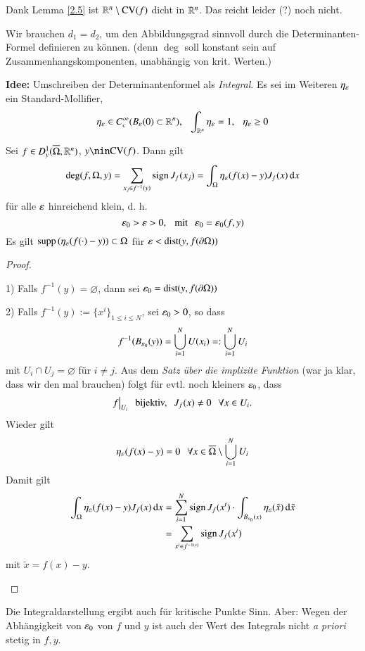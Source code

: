 \noindent Dank Lemma \ref{2.5} ist $\mathbb{R}^n\setminus \mathrm{CV}(f)$ dicht in $\mathbb{R}^n$. Das reicht leider (?)
noch nicht.

\noindent Wir brauchen $d_1=d_2$, um den Abbildungsgrad sinnvoll durch die Determinanten-Formel
definieren zu können. (denn $\deg$ soll konstant sein auf Zusammenhangskomponenten, unabhängig
von krit. Werten.)

\textbf{Idee:} Umschreiben der Determinantenformel als \textit{Integral}.
Es sei im Weiteren $\eta_\varepsilon$ ein Standard-Mollifier, 
\[
    \eta_\varepsilon \in C^\infty_c(B_\varepsilon(0)\subset \mathbb{R}^n), \hspace{.25cm} \int_{\mathbb{R}^n} \eta_\varepsilon=1,\hspace{.25cm} \eta_\varepsilon\geq 0
\]

\begin{lem}\label{2.6}
    Sei $f\in D^1_y(\overline \Omega, \mathbb{R}^n)$, $y\nin \CV(f)$. Dann gilt
    \begin{align}\label{5}
        \deg(f,\Omega,y)=\sum_{x_j\in f^{-1}(y)}\mathrm{sign}\, J_f(x_j)=\int_\Omega \eta_\varepsilon (f(x)-y) J_f(x)\, \mathrm{d} x
    \end{align}
    für alle $\varepsilon$ hinreichend klein, d. h.
    \[
        \varepsilon_0>\varepsilon>0, \hspace{.25cm} \text{mit} \hspace{.25cm} \varepsilon_0=\varepsilon_0(f,y)
    \]
    Es gilt $\mathrm{supp}\, (\eta_\varepsilon(f(\cdot)-y))\subset \Omega$ für $\varepsilon < \mathrm{dist}(y,f(\partial \Omega))$
\end{lem}

\begin{proof}
    \begin{description}
        \item{1)} 
        Falls $f^{-1}(y)=\varnothing$, dann sei $\varepsilon_0=\mathrm{dist}(y,f(\partial \Omega))$
        \item{2)}
        Falls $f^{-1}(y):= \{x^i\}_{1\leq i \leq N}$, sei $\varepsilon_0>0$, so dass
        \[
            f^{-1}(B_{\varepsilon_0}(y)) = \bigcup_{i=1}^N U(x_i)=:\bigcup_{i=1}^N U_i
        \]
        mit $U_i\cap U_j=\varnothing$ für $i\neq j$.
        Aus dem \textit{Satz über die implizite Funktion} (war ja klar, dass wir den mal brauchen)
        folgt für evtl. noch kleiners $\varepsilon_0$, dass
        \[
            f\big|_{U_i} \hspace{.25cm} \text{bijektiv,} \hspace{.25cm} J_f(x)\neq 0 \hspace{.25cm} \forall x \in U_i.
        \]
        Wieder gilt
        \[
            \eta _{\varepsilon}(f(x)-y)=0 \hspace{.25cm} \forall x\in \overline \Omega \setminus \bigcup _{i=1}^N U_i
        \]
        Damit gilt
        \begin{align*}
            \int_\Omega \eta_\varepsilon(f(x)-y) J_f(x) \, \mathrm{d} x&= \sum_{i=1}^N \mathrm{sign}\, J_f(x^i)\cdot
            \int_{B_{\varepsilon_0}(x)}\eta_\varepsilon (\tilde x ) \, \mathrm{d} \tilde x\\
            &=\sum_{x^i\in f^{-1(y)}} \mathrm{sign}\,  J_f(x^i)
        \end{align*}
        mit $\tilde x=f(x)-y$.
    \end{description}
    \[ \]
\end{proof}
Die Integraldarstellung ergibt auch für kritische Punkte Sinn. Aber:
Wegen der Abhängigkeit von $\varepsilon_0$ von $f$ und $y$ ist auch der Wert des Integrals nicht
\textit{a priori} stetig in $f,y$.

